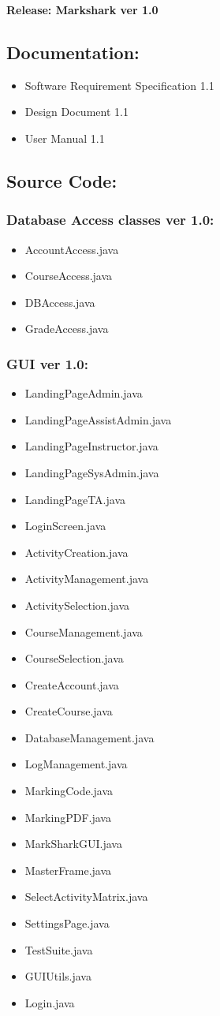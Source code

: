 \documentclass{article}
\begin{document}
\textbf{Release: Markshark ver 1.0}\\
\subsection{Documentation:}
\begin{itemize}
  \item Software Requirement Specification 1.1
  \item Design Document 1.1
  \item User Manual 1.1
\end{itemize}

\subsection{Source Code:}
\subsubsection{Database Access classes ver 1.0:}
\begin{itemize}
\item AccountAccess.java
\item CourseAccess.java
\item DBAccess.java
\item GradeAccess.java
\end{itemize}

\subsubsection{GUI ver 1.0:}
\begin{itemize}
\item LandingPageAdmin.java
\item LandingPageAssistAdmin.java
\item LandingPageInstructor.java
\item LandingPageSysAdmin.java
\item LandingPageTA.java
\item LoginScreen.java
\item ActivityCreation.java
\item ActivityManagement.java
\item ActivitySelection.java
\item CourseManagement.java
\item CourseSelection.java
\item CreateAccount.java
\item CreateCourse.java
\item DatabaseManagement.java
\item LogManagement.java
\item MarkingCode.java
\item MarkingPDF.java
\item MarkSharkGUI.java
\item MasterFrame.java
\item SelectActivityMatrix.java
\item SettingsPage.java
\item TestSuite.java
\item GUIUtils.java
\item Login.java
\end{itemize}
\end{document}

